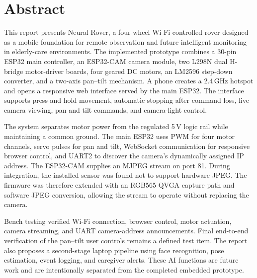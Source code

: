 \documentclass[12pt,a4paper,oneside]{report}
\newcommand{\ProjectTitle}{Neural Rover}
\begin{document}
\chapter*{Abstract}
This report presents \ProjectTitle, a four-wheel Wi-Fi controlled rover designed
as a mobile foundation for remote observation and future intelligent monitoring
in elderly-care environments. The implemented prototype combines a 30-pin ESP32
main controller, an ESP32-CAM camera module, two L298N dual H-bridge motor-driver
boards, four geared DC motors, an LM2596 step-down converter, and a two-axis
pan--tilt mechanism. A phone creates a 2.4\,GHz hotspot and opens a responsive
web interface served by the main ESP32. The interface supports press-and-hold
movement, automatic stopping after command loss, live camera viewing, pan and
tilt commands, and camera-light control.

The system separates motor power from the regulated 5\,V logic rail while
maintaining a common ground. The main ESP32 uses PWM for four motor channels,
servo pulses for pan and tilt, WebSocket communication for responsive browser
control, and UART2 to discover the camera's dynamically assigned IP address.
The ESP32-CAM supplies an MJPEG stream on port 81. During integration, the
installed sensor was found not to support hardware JPEG. The firmware was
therefore extended with an RGB565 QVGA capture path and software JPEG
conversion, allowing the stream to operate without replacing the camera.

Bench testing verified Wi-Fi connection, browser control, motor actuation,
camera streaming, and UART camera-address announcements. Final end-to-end
verification of the pan--tilt user controls remains a defined test item. The
report also proposes a second-stage laptop pipeline using face recognition,
pose estimation, event logging, and caregiver alerts. These AI functions are
future work and are intentionally separated from the completed embedded
prototype.

\tableofcontents
\listoffigures
\listoftables
\clearpage
\end{document}
